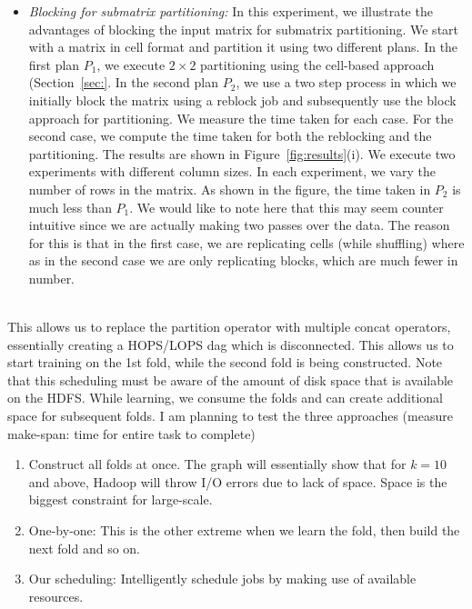 \documentclass{vldb}
\newcommand{\topic}[1]{\par \smallskip \smallskip \noindent{\bf \uline{#1}}}
\begin{document}
\topic{Optimization}

\begin{itemize}
\item {\em Blocking for submatrix partitioning:} 
In this experiment, we illustrate the advantages of
blocking the input matrix for submatrix partitioning. We start with a matrix in
cell format and partition it using two different plans. In the first plan $P_1$, we
execute $2\times 2$ partitioning using the cell-based approach
(Section~\ref{sec:}. In the second plan $P_2$, we use a two step process in which we 
initially block the matrix using a reblock job and subsequently use the
block approach for partitioning. We measure the time taken for each case. For
the second case, we compute the time taken for both the reblocking and the
partitioning. The results are shown in Figure~\ref{fig:results}(i). We execute
two experiments with different column sizes. In each experiment, we vary the
number of rows in the matrix.
As shown in the figure, the time taken in $P_2$ is much less than $P_1$. We
would like to note here that this may seem counter intuitive
since we are actually making two passes over the data. The reason for this is
that in the first case, we are replicating cells (while shuffling) where as in
the second case we are only replicating blocks, which are much fewer in number.
\end{itemize}


\topic{\em Scheduling:}\\ This allows us to replace the partition operator
with multiple concat operators, essentially creating a HOPS/LOPS dag which is
disconnected. This allows us to start training on the 1st fold, while the second
fold is being constructed. Note that this scheduling must be aware of the amount
of disk space that is available on the HDFS. While learning, we consume the
folds and can create additional space for subsequent folds. I am planning to
test the three approaches (measure make-span: time for entire task to complete)
\begin{enumerate}
\item Construct all folds at once. The graph will essentially show that for
$k=10$ and above, Hadoop will throw I/O errors due to lack of space. Space is
the biggest constraint for large-scale.
\item One-by-one: This is the other extreme when we learn the fold, then build
the next fold and so on.
\item Our scheduling: Intelligently schedule jobs by making use of available
resources.
\end{enumerate}
\end{document}
